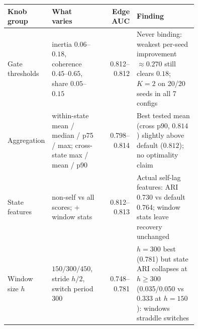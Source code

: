 {\sloppy\setlength{\tabcolsep}{3pt}\begin{tabular}{p{0.17\linewidth}p{0.26\linewidth}rp{0.32\linewidth}}
\toprule
Knob group & What varies & Edge AUC & Finding \\
\midrule
Gate thresholds & inertia $0.06$--$0.18$, coherence $0.45$--$0.65$, share $0.05$--$0.15$ & 0.812--0.812 & Never binding: weakest per-seed improvement $\approx 0.270$ still clears $0.18$; $K{=}2$ on 20/20 seeds in all 7 configs \\
Aggregation & within-state mean / median / p75 / max; cross-state max / mean / p90 & 0.798--0.814 & Best tested mean (cross p90, $0.814$) slightly above default ($0.812$); no optimality claim \\
State features & non-self vs all scores; $+$ window stats & 0.812--0.813 & Actual self-lag features: ARI 0.730 vs default 0.764; window stats leave recovery unchanged \\
Window size $h$ & $150/300/450$, stride $h/2$, switch period 300 & 0.748--0.781 & $h{=}300$ best (0.781) but state ARI collapses at $h \geq 300$ (0.035/0.050 vs 0.333 at $h{=}150$): windows straddle switches \\
\bottomrule
\end{tabular}}
